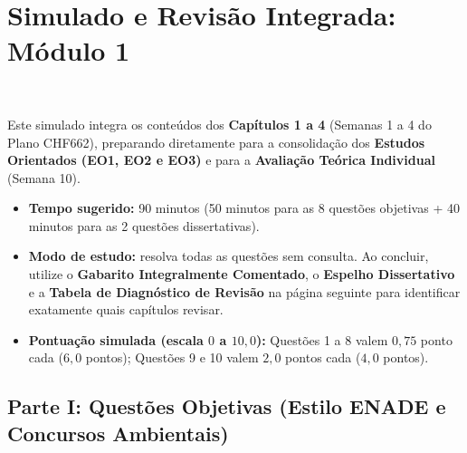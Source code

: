 
\clearpage
{}
{}
\chapter*{Simulado e Revisão Integrada: Módulo 1}

\noindent\tagEmenta\ \ \ 

\vspace{6pt}

\begin{boxConceito}
Este simulado integra os conteúdos dos \textbf{Capítulos 1 a 4} (Semanas 1 a 4 do Plano CHF662), preparando diretamente para a consolidação dos \textbf{Estudos Orientados (EO1, EO2 e EO3)} e para a \textbf{Avaliação Teórica Individual} (Semana 10).
\begin{itemize}[leftmargin=1.5em, itemsep=2pt]
  \item \textbf{Tempo sugerido:} 90 minutos (50 minutos para as 8 questões objetivas + 40 minutos para as 2 questões dissertativas).
  \item \textbf{Modo de estudo:} resolva todas as questões sem consulta. Ao concluir, utilize o \textbf{Gabarito Integralmente Comentado}, o \textbf{Espelho Dissertativo} e a \textbf{Tabela de Diagnóstico de Revisão} na página seguinte para identificar exatamente quais capítulos revisar.
  \item \textbf{Pontuação simulada (escala $0$ a $10,0$):} Questões 1 a 8 valem $0,75$ ponto cada ($6,0$ pontos); Questões 9 e 10 valem $2,0$ pontos cada ($4,0$ pontos).
\end{itemize}
\end{boxConceito}

\section*{Parte I: Questões Objetivas (Estilo ENADE e Concursos Ambientais)}

